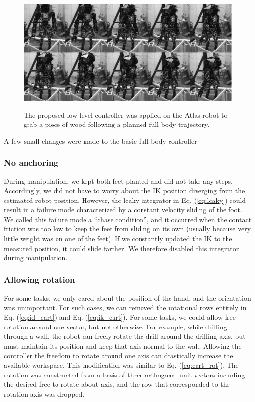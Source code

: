 \documentclass{ws-ijhr}
\newcommand{\eref}[1] {Eq. (\ref{#1})}
\begin{document}
\begin{figure} 
  \begin{center}
    {\includegraphics[width=1\textwidth]{images/debris.eps}}
    \caption{The proposed low level controller was applied on the Atlas robot 
      to grab a piece of wood following a planned full body trajectory.}
			\label{fig:manip}
  \end{center}
\end{figure}  
 
A few small changes were made to the basic full body controller:
\subsubsection{No anchoring}
During manipulation, we kept both feet planted and did not take any steps. 
Accordingly, we did not have to worry about the IK position diverging from the 
estimated robot position. 
However, the leaky integrator in \eref{eq:leaky} could result in a failure mode 
characterized by a constant velocity sliding of the foot. 
We called this failure mode a ``chase condition'', and it occurred when 
the contact friction was too low to keep the feet from sliding on its own 
(usually because very little weight was on one of the feet). 
If we constantly updated the IK to the measured position, it could slide farther. 
We therefore disabled this integrator during manipulation.
\label{sec:chase_condition}

\subsubsection{Allowing rotation}
For some tasks, we only cared about the position of the hand, and the 
orientation was unimportant. 
For such cases, we can removed the rotational rows entirely 
in \eref{eq:id_cart} and \eref{eq:ik_cart}. 
For some tasks, we could allow free rotation around one vector, but not 
otherwise. 
For example, while drilling through a wall, the robot can freely rotate the 
drill around the drilling axis, but must maintain its position and keep that 
axis normal to the wall. 
Allowing the controller the freedom to rotate around one axis can drastically 
increase the available workspace. 
This modification was similar to \eref{eq:cart_rot}. 
The rotation was constructed from a basis of three orthogonal unit vectors including 
the desired free-to-rotate-about axis, and the row that corresponded to the 
rotation axis was dropped. 
\end{document}
